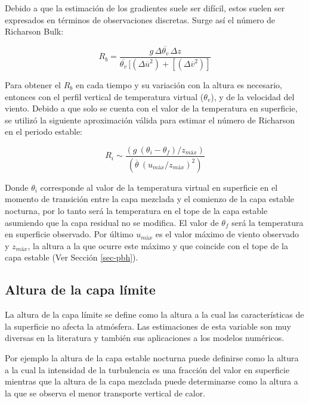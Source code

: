\documentclass[12pt,spanish,oneside]{book}
\begin{document}
Debido a que la estimación de los gradientes suele ser difícil, estos
suelen ser expresados en términos de observaciones discretas. Surge así
el número de Richarson Bulk:

\begin{equation} \label{eq-ri2}
R_b = \frac{g \, \Delta \overline{\theta_v} \, \Delta z}{\overline{\theta_v} \, [(\Delta \overline{u}^2) + [(\Delta \overline{v}^2)]}
\end{equation}

Para obtener el \(R_b\) en cada tiempo y su variación con la altura es
necesario, entonces con el perfil vertical de temperatura virtual
(\(\theta_v\)), y de la velocidad del viento. Debido a que solo se
cuenta con el valor de la temperatura en superficie, se utilizó la
siguiente aproximación válida para estimar el número de Richarson en el
periodo estable:

\begin{equation} \label{eq-ri3}
R_i \sim \frac{(g  \: (\theta_i - \theta_f)/z_{máx})}{(\overline{\theta} \: (u_{máx}/z_{máx})^2)}
\end{equation}

Donde \(\theta_i\) corresponde al valor de la temperatura virtual en
superficie en el momento de transición entre la capa mezclada y el
comienzo de la capa estable nocturna, por lo tanto será la temperatura
en el tope de la capa estable asumiendo que la capa residual no se
modifica. El valor de \(\theta_f\) será la temperatura en superficie
observado. Por último \(u_{máx}\) es el valor máximo de viento observado
y \(z_{máx}\), la altura a la que ocurre este máximo y que coincide con
el tope de la capa estable (Ver Sección \ref{sec-pbh}).

\subsection{\texorpdfstring{Altura de la capa límite
\label{sec-pbh}}{Altura de la capa límite }}\label{altura-de-la-capa-limite}

La altura de la capa límite se define como la altura a la cual las
características de la superficie no afecta la atmósfera. Las
estimaciones de esta variable son muy diversas en la literatura y
también sus aplicaciones a los modelos numéricos.

Por ejemplo la altura de la capa estable nocturna puede definirse como
la altura a la cual la intensidad de la turbulencia es una fracción del
valor en superficie mientras que la altura de la capa mezclada puede
determinarse como la altura a la que se observa el menor transporte
vertical de calor.
\end{document}
